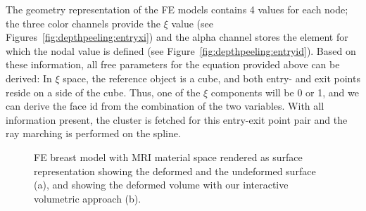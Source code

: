 \documentclass[journal]{vgtc}                %
\begin{document}
The geometry representation of the FE models contains 4 values for each node; the three color channels provide the $\xi$ value (see Figures~\ref{fig:depthpeeling:entryxi}) and the alpha channel stores the element for which the nodal value is defined (see Figure~\ref{fig:depthpeeling:entryid}). Based on these information, all free parameters for the equation provided above can be derived: In $\xi$ space, the reference object is a cube, and both entry- and exit points reside on a side of the cube. Thus, one of the $\xi$ components will be 0 or 1, and we can derive the face id from the combination of the two variables. With all information present, the cluster is fetched for this entry-exit point pair and the ray marching is performed on the spline.
%
\begin{figure}
    \centering 
    \caption{FE breast model with MRI material space rendered as surface representation showing the deformed and the undeformed surface (a), and showing the deformed volume with our interactive volumetric approach (b).}
    \label{fig:breast}
\end{figure}
%
\end{document}
